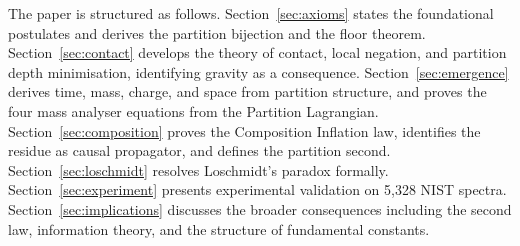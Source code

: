 \documentclass[11pt,twocolumn,a4paper]{article}
\theoremstyle{plain}
\theoremstyle{definition}
\theoremstyle{remark}
\begin{document}
The paper is structured as follows. Section~\ref{sec:axioms} states the
foundational postulates and derives the partition bijection and the floor theorem.
Section~\ref{sec:contact} develops the theory of contact, local negation, and
partition depth minimisation, identifying gravity as a consequence.
Section~\ref{sec:emergence} derives time, mass, charge, and space from partition
structure, and proves the four mass analyser equations from the Partition
Lagrangian. Section~\ref{sec:composition} proves the Composition Inflation law,
identifies the residue as causal propagator, and defines the partition second.
Section~\ref{sec:loschmidt} resolves Loschmidt's paradox formally.
Section~\ref{sec:experiment} presents experimental validation on 5,328 NIST
spectra. Section~\ref{sec:implications} discusses the broader consequences
including the second law, information theory, and the structure of fundamental
constants.
\end{document}
